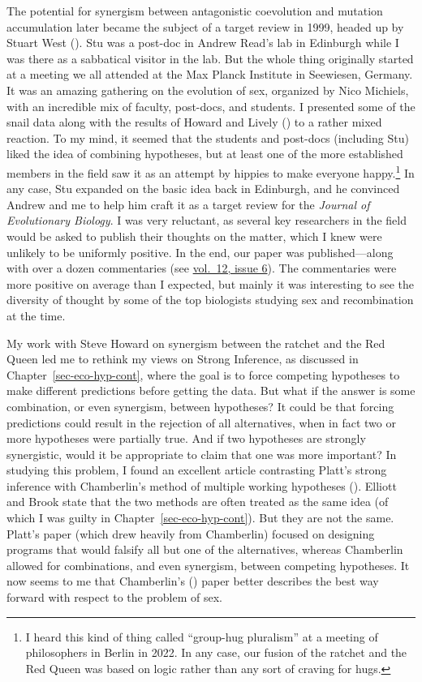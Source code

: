 \documentclass[
  letterpaper,
]{book}
\begin{document}
The potential for synergism between antagonistic coevolution and
mutation accumulation later became the subject of a target review in
1999, headed up by Stuart West (). Stu was
a post-doc in Andrew Read's lab in Edinburgh while I was there as a
sabbatical visitor in the lab. But the whole thing originally started at
a meeting we all attended at the Max Planck Institute in Seewiesen,
Germany. It was an amazing gathering on the evolution of sex, organized
by Nico Michiels, with an incredible mix of faculty, post-docs, and
students. I presented some of the snail data along with the results of
Howard and Lively () to a rather mixed
reaction. To my mind, it seemed that the students and post-docs
(including Stu) liked the idea of combining hypotheses, but at least one
of the more established members in the field saw it as an attempt by
hippies to make everyone happy.\footnote{I heard this kind of thing
  called ``group-hug pluralism'' at a meeting of philosophers in Berlin
  in 2022. In any case, our fusion of the ratchet and the Red Queen was
  based on logic rather than any sort of craving for hugs.} In any case,
Stu expanded on the basic idea back in Edinburgh, and he convinced
Andrew and me to help him craft it as a target review for the
\emph{Journal of Evolutionary Biology}. I was very reluctant, as several
key researchers in the field would be asked to publish their thoughts on
the matter, which I knew were unlikely to be uniformly positive. In the
end, our paper was published---along with over a dozen commentaries (see
\href{https://onlinelibrary.wiley.com/toc/14209101/1999/12/6}{vol.~12,
issue 6}). The commentaries were more positive on average than I
expected, but mainly it was interesting to see the diversity of thought
by some of the top biologists studying sex and recombination at the
time.

My work with Steve Howard on synergism between the ratchet and the Red
Queen led me to rethink my views on Strong Inference, as discussed in
Chapter~\ref{sec-eco-hyp-cont}, where the goal is to force competing
hypotheses to make different predictions before getting the data. But
what if the answer is some combination, or even synergism, between
hypotheses? It could be that forcing predictions could result in the
rejection of all alternatives, when in fact two or more hypotheses were
partially true. And if two hypotheses are strongly synergistic, would it
be appropriate to claim that one was more important? In studying this
problem, I found an excellent article contrasting Platt's strong
inference with Chamberlin's method of multiple working hypotheses
(). Elliott and Brook
state that the two methods are often treated as the same idea (of which
I was guilty in Chapter~\ref{sec-eco-hyp-cont}). But they are not the
same. Platt's paper (which drew heavily from Chamberlin) focused on
designing programs that would falsify all but one of the alternatives,
whereas Chamberlin allowed for combinations, and even synergism, between
competing hypotheses. It now seems to me that Chamberlin's
() paper better describes the best
way forward with respect to the problem of sex.
\end{document}
